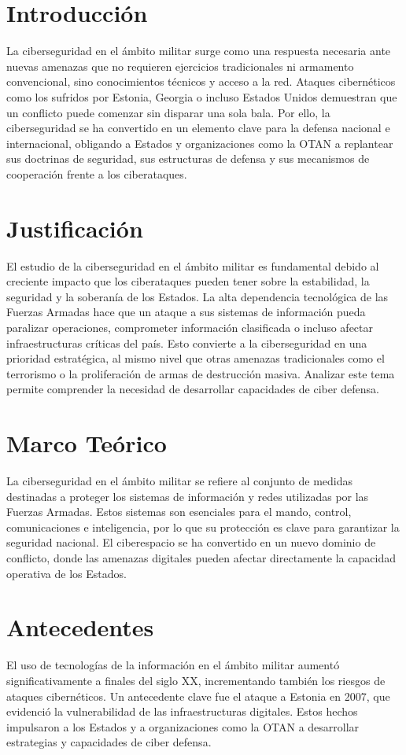 \documentclass[12pt]{article}
\begin{document}
\section{Introducción}
La ciberseguridad en el ámbito militar surge como una respuesta necesaria ante nuevas amenazas que no requieren ejercicios tradicionales ni armamento convencional, sino conocimientos técnicos y acceso a la red. Ataques cibernéticos como los sufridos por Estonia, Georgia o incluso Estados Unidos demuestran que un conflicto puede comenzar sin disparar una sola bala. Por ello, la ciberseguridad se ha convertido en un elemento clave para la defensa nacional e internacional, obligando a Estados y organizaciones como la OTAN a replantear sus doctrinas de seguridad, sus estructuras de defensa y sus mecanismos de cooperación frente a los ciberataques.

\section{Justificación}
El estudio de la ciberseguridad en el ámbito militar es fundamental debido al creciente impacto que los ciberataques pueden tener sobre la estabilidad, la seguridad y la soberanía de los Estados. La alta dependencia tecnológica de las Fuerzas Armadas hace que un ataque a sus sistemas de información pueda paralizar operaciones, comprometer información clasificada o incluso afectar infraestructuras críticas del país. Esto convierte a la ciberseguridad en una prioridad estratégica, al mismo nivel que otras amenazas tradicionales como el terrorismo o la proliferación de armas de destrucción masiva. Analizar este tema permite comprender la necesidad de desarrollar capacidades de ciber defensa.

\section{Marco Teórico}
La ciberseguridad en el ámbito militar se refiere al conjunto de medidas destinadas a proteger los sistemas de información y redes utilizadas por las Fuerzas Armadas. Estos sistemas son esenciales para el mando, control, comunicaciones e inteligencia, por lo que su protección es clave para garantizar la seguridad nacional. El ciberespacio se ha convertido en un nuevo dominio de conflicto, donde las amenazas digitales pueden afectar directamente la capacidad operativa de los Estados.

\section{Antecedentes}
El uso de tecnologías de la información en el ámbito militar aumentó significativamente a finales del siglo XX, incrementando también los riesgos de ataques cibernéticos. Un antecedente clave fue el ataque a Estonia en 2007, que evidenció la vulnerabilidad de las infraestructuras digitales. Estos hechos impulsaron a los Estados y a organizaciones como la OTAN a desarrollar estrategias y capacidades de ciber defensa.
\end{document}
